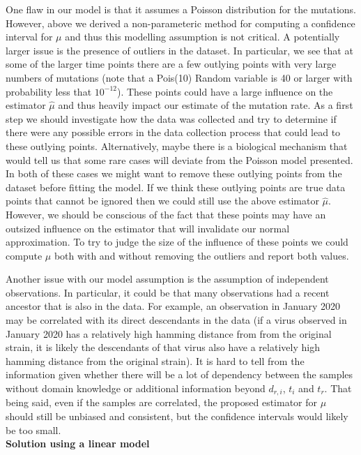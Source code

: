 One flaw in our model is that it assumes a Poisson distribution for the mutations. However, above we derived a non-parameteric method for computing a confidence interval for $\mu$ and thus this modelling assumption is not critical. A potentially larger issue is the presence of outliers in the dataset. In particular, we see that at some of the larger time points there are a few outlying points with very large numbers of mutations (note that a Pois(10) Random variable is 40 or larger with probability less that $10^{-12}$).  These points could have a large influence on the estimator $\hat{\mu}$ and thus heavily impact our estimate of the mutation rate. As a first step we should investigate how the data was collected and try to determine if there were any possible errors in the data collection process that could lead to these outlying points. Alternatively, maybe there is a biological mechanism that would tell us that some rare cases will deviate from the Poisson model presented. In both of these cases we might want to remove these outlying points from the dataset before fitting the model. If we think these outlying points are true data points that cannot be ignored then we could still use the above estimator $\hat{\mu}$. However, we should be conscious of the fact that these points may have an outsized influence on the estimator that will invalidate our normal approximation. To try to judge the size of the influence of these points we could compute $\hat{\mu}$ both with and without removing the outliers and report both values.

Another issue with our model assumption is the assumption of independent observations. In particular, it could be that many observations had a recent ancestor that is also in the data. For example, an observation in January 2020 may be correlated with its direct descendants in the data (if a virus observed in January 2020 has a relatively high hamming distance from from the original strain, it is likely the descendants of that virus also have a relatively high hamming distance from the original strain). It is hard to tell from the information given whether there will be a lot of dependency between the samples without domain knowledge or additional information beyond $d_{r,i}$, $t_i$ and $t_r$. That being said, even if the samples are correlated, the proposed estimator for $\mu$ should still be unbiased and consistent, but the confidence intervals would likely be too small. \\

\noindent \textbf{Solution using a linear model}\\


